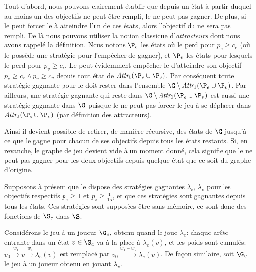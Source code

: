 Tout d'abord, nous pouvons clairement établir que depuis un état à partir duquel au moins un des objectifs ne peut être rempli, le \jo ne peut pas gagner.
De plus, si le \ji peut forcer le \jo à atteindre l'un de ces états, alors l'objectif du \jo ne sera pas rempli.
De là nous pouvons utiliser la notion classique d'\emph{attracteurs} dont nous avons rappelé la définition.
Nous notons $\P_e$ les états où le \jo perd pour $p_e \geq c_e$ (\cad où le \ji possède une stratégie pour l'empêcher de gagner), et $\P_v$ les états pour lesquels le \jo perd pour $p_v \geq c_v$.
Le \ji peut évidemment empêcher le \jo d'atteindre son objectif $p_e \geq c_e \wedge p_v \geq c_v$ depuis tout état de $\attractor{1}(\P_e \cup \P_v)$.
Par conséquent toute stratégie gagnante pour le \jo doit rester dans l'ensemble $\G \setminus\attractor{1}(\P_e \cup \P_v)$.
Par ailleurs, une stratégie gagnante qui reste dans $\G \setminus\attractor{1}(\P_e \cup \P_v)$ est aussi une stratégie gagnante dans $\G$ puisque le \ji ne peut pas forcer le jeu à se déplacer dans $\attractor{1}(\P_e \cup \P_v)$ (par définition des attracteurs).

Ainsi il devient possible de retirer, de manière récursive, des états de $\G$ jusqu'à ce que le \jo gagne pour chacun de ses objectifs depuis tous les états restants.
Si, en revanche, le graphe de jeu devient vide à un moment donné, cela signifie que le \jo ne peut pas gagner pour les deux objectifs depuis quelque état que ce soit du graphe d'origine.

Supposons à présent que le \jo dispose des stratégies gagnantes $\lambda_e$, $\lambda_v$ pour les objectifs respectifs $p_e \geq 1$ et $p_v \geq \frac1{15}$, et que ces stratégies sont gagnantes depuis tous les états.
Ces stratégies sont supposées être sans mémoire, ce sont donc des fonctions de $\S_c$ dans $\S$.

Considérons le jeu à un joueur $\G_e$, obtenu quand le \jo joue $\lambda_e$: chaque arête entrante dans un état $v \in \S_c$ va à la place à $\lambda_e(v)$, et les poids sont cumulés: $v_0 \xrightarrow{w_1} v \xrightarrow{w_2} \lambda_e(v)$ est remplacé par $v_0 \xrightarrow{w_1+w_2} \lambda_e(v)$.
De façon similaire, soit $\G_v$ le jeu à un joueur obtenu en jouant $\lambda_v$.

